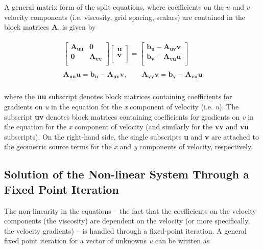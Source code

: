 A general matrix form of the split equations, where coefficients on the $u$ and $v$ velocity components (i.e. viscosity, grid spacing, scalars) are contained in the block matrices \textbf{A}, is given by 

\begin{align*}
\begin{matrix}
  \left[ \begin{matrix}
   \mathbf{A}_{\mathbf{uu}} & \mathbf{0}  \\
   \mathbf{0} & \mathbf{A}_{\mathbf{vv}}  \\
\end{matrix} \right]\left[ \begin{matrix}
   \mathbf{u}  \\
   \mathbf{v}  \\
\end{matrix} \right]=\left[ \begin{matrix}
   \mathbf{b}_{\mathbf{u}}-\mathbf{A}_{\mathbf{uv}}\mathbf{v}  \\
   \mathbf{b}_{\mathbf{v}}-\mathbf{A}_{\mathbf{vu}}\mathbf{u}  \\
\end{matrix} \right] \\ 
   \\ 
  \mathbf{A}_{\mathbf{uu}}\mathbf{u}=\mathbf{b}_{\mathbf{u}}-\mathbf{A}_{\mathbf{uv}}\mathbf{v},\quad \quad \mathbf{A}_{\mathbf{vv}}\mathbf{v}=\mathbf{b}_{\mathbf{v}}-\mathbf{A}_{\mathbf{vu}}\mathbf{u} \\ 
\end{matrix}
\end{align*}

where the \textbf{uu} subscript denotes block matrices containing coefficients for gradients on \textit{u} in the equation for the \textit{x} component of velocity (i.e. \textit{u}). The subscript \textbf{uv} denotes block matrices containing coefficients for gradients on \textit{v} in the equation for the \textit{x} component of velocity (and similarly for the \textbf{vv} and \textbf{vu} subscripts). On the right-hand side, the single subscripts \textbf{u} and \textbf{v} are attached to the geometric source terms for the \textit{x} and \textit{y} components of velocity, respectively.

\subsection{Solution of the Non-linear System Through a Fixed Point Iteration}
The non-linearity in the equations -- the fact that the coefficients on the velocity components (the viscosity) are dependent on the velocity (or more specifically, the velocity gradients) -- is handled through a fixed-point iteration. A general fixed point iteration for a vector of unknowns \textit{u} can be written as 

